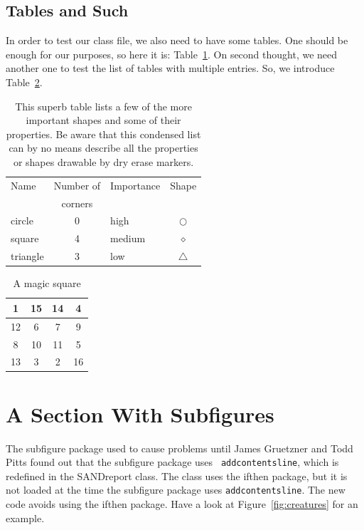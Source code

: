 \documentclass[pdf,ps2pdf,12pt]{smemo}
\begin{document}
\begin{memo}
\subsection{Tables and Such}
In order to test our class file, we also need to have some tables. One
should be enough for our purposes, so here it is: Table~\ref{tab1}. On
second thought, we need another one to test the list of tables with
multiple entries. So, we introduce Table~\ref{tab2}.

\begin{table}[ht]
  \centering
  \caption[Shapes]{This superb table lists a few
    of the more important shapes and some of
    their properties. Be aware that this condensed list
    can by no means describe all the properties or
    shapes drawable by dry erase markers.}
  \bigskip

  \begin{tabular}{|l|c|l|c|}
    \hline \hline
    Name  & Number of & Importance & Shape \\
    & corners   &            &       \\
    \hline
    circle & 0        & high       & $\bigcirc$ \\
    square & 4        & medium     & $\diamond$ \\
    triangle & 3      & low        & $\triangle$ \\
    \hline
  \end{tabular}
  \label{tab1}
\end{table}

\begin{table}[ht]
  \centering
  \caption{A magic square}
  \bigskip
  
  \begin{tabular}{|c|c|c|c|}
    \hline
    1 & 15 & 14 & 4 \\ \hline
    12 & 6 & 7 & 9 \\ \hline
    8 & 10 & 11 & 5 \\ \hline
    13 & 3 & 2 & 16 \\ \hline
  \end{tabular}
  \label{tab2}
\end{table}

\section{A Section With Subfigures}
The subfigure package used to cause problems until James Gruetzner and
Todd Pitts found out that the subfigure package uses {\tt
  addcontentsline}, which is redefined in the SANDreport class. The
class uses the ifthen package, but it is not loaded at the time the
subfigure package uses {\tt addcontentsline}.  The new code avoids
using the ifthen package.  Have a look at Figure~\ref{fig:creatures} 
for an example.


\end{memo}
\end{document}
